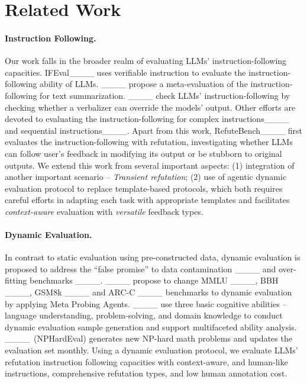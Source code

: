 \section{Related Work}
\paragraph*{Instruction Following.}
Our work falls in the broader realm of evaluating LLMs' instruction-following capacities.
IFEval____ uses verifiable instruction to evaluate the instruction-following ability of LLMs. 
____ propose a meta-evaluation of the instruction-following for text summarization. ____ check LLMs’ instruction-following by checking whether a verbalizer can override the models’ output.
Other efforts are devoted to evaluating the instruction-following for complex instructions____ and sequential instructions____.
Apart from this work, RefuteBench____ first evaluates the instruction-following with refutation, investigating whether LLMs can follow  user's feedback in modifying its output or be stubborn to original outputs. 
We extend this work from several important aspects: (1) integration of another important scenario -- \emph{Transient refutation}; (2) use of agentic dynamic evaluation protocol to replace template-based protocols, which both requires careful efforts in adapting each task with appropriate templates and facilitates \textit{context-aware} evaluation with \textit{versatile} feedback types. 

\paragraph*{Dynamic Evaluation.}
In contrast to static evaluation using pre-constructed data, 
dynamic evaluation is proposed to address the “false promise” to data contamination ____ and over-fitting benchmarks ____.
____ propose to change MMLU ____, BBH ____, GSM8k ____ and ARC-C ____ benchmarks to dynamic evaluation by applying Meta Probing Agents.
____ use three basic cognitive abilities -- language understanding, problem-solving, and domain knowledge to conduct dynamic evaluation sample generation and support multifaceted ability analysis.
____~(NPHardEval) generates new NP-hard math problems and updates the evaluation set monthly.
Using a dynamic evaluation protocol, we evaluate LLMs' refutation instruction following capacities with context-aware, and human-like instructions, comprehensive refutation types, and low human annotation cost.

